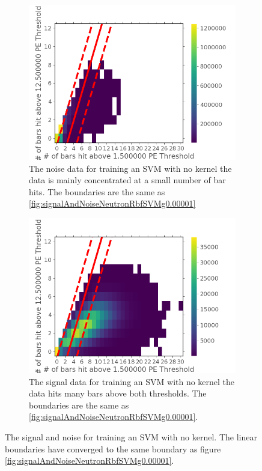 \begin{figure}[H]
\centering
\begin{subfigure}{.5\textwidth}
  \centering
  \includegraphics[width=\linewidth]{Chapter4/Figs/Raster/svmLinAndRbf/noiseNeutronLinSVM.png}
  \captionsetup{width=.9\linewidth}
  \caption{The noise data for training an SVM with no kernel the data is mainly concentrated at a small number of bar hits. The boundaries are the same as \ref{fig:signalAndNoiseNeutronRbfSVMg0.00001}}
  \label{subFig:noiseNeutronLinSVM}
\end{subfigure}%
\begin{subfigure}{.5\textwidth}
  \centering
  \includegraphics[width=\linewidth]{Chapter4/Figs/Raster/svmLinAndRbf/signalNeutronLinSVM.png}
  \captionsetup{width=.9\linewidth}
  \caption{The signal data for training an SVM with no kernel the data hits many bars above both thresholds. The boundaries are the same as \ref{fig:signalAndNoiseNeutronRbfSVMg0.00001}.}
  \label{subFig:signalNeutronLinSVM}
\end{subfigure}
\caption{The signal and noise for training an SVM with no kernel. The linear boundaries have converged to the same boundary as figure \ref{fig:signalAndNoiseNeutronRbfSVMg0.00001}.}
\label{fig:signalAndNoiseNeutronLinSVM}
\end{figure}

